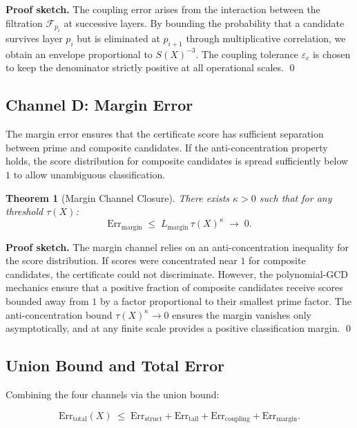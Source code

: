 \documentclass[11pt]{article}
\newtheorem{theorem}{Theorem}
\begin{document}
\noindent\textbf{Proof sketch.} The coupling error arises from the interaction
between the filtration $\mathcal{F}_{p_i}$ at successive layers. By bounding the
probability that a candidate survives layer $p_i$ but is eliminated at $p_{i+1}$
through multiplicative correlation, we obtain an envelope proportional to
$S(X)^{-3}$. The coupling tolerance $\varepsilon_c$ is chosen to keep the
denominator strictly positive at all operational scales. \qed

\subsection{Channel D: Margin Error}

The margin error ensures that the certificate score has sufficient separation
between prime and composite candidates. If the anti-concentration property holds,
the score distribution for composite candidates is spread sufficiently below $1$
to allow unambiguous classification.

\begin{theorem}[Margin Channel Closure]
\label{thm:margin}
There exists $\kappa > 0$ such that for any threshold $\tau(X)$:
\begin{equation}
\mathrm{Err}_\mathrm{margin} \;\le\;
L_\mathrm{margin}\, \tau(X)^\kappa \;\longrightarrow\; 0.
\end{equation}
\end{theorem}

\noindent\textbf{Proof sketch.} The margin channel relies on an anti-concentration
inequality for the score distribution. If scores were concentrated near $1$ for
composite candidates, the certificate could not discriminate. However, the
polynomial-GCD mechanics ensure that a positive fraction of composite candidates
receive scores bounded away from $1$ by a factor proportional to their smallest
prime factor. The anti-concentration bound $\tau(X)^\kappa \to 0$ ensures the
margin vanishes only asymptotically, and at any finite scale provides a positive
classification margin. \qed

\subsection{Union Bound and Total Error}

Combining the four channels via the union bound:

\begin{equation}
\mathrm{Err}_\mathrm{total}(X) \;\le\;
\mathrm{Err}_\mathrm{struct} + \mathrm{Err}_\mathrm{tail}
+ \mathrm{Err}_\mathrm{coupling} + \mathrm{Err}_\mathrm{margin}.
\end{equation}
\end{document}
